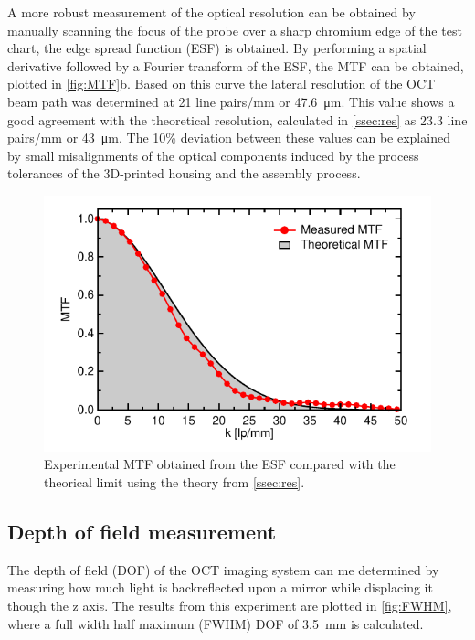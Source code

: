 \documentclass[10pt]{iopart}
\begin{document}
A more robust measurement of the optical resolution can be obtained by manually scanning the focus of the probe over a sharp chromium edge of the test chart, the edge spread function (ESF) is obtained. By performing a spatial derivative followed by a Fourier transform of the ESF, the MTF can be obtained, plotted in \autoref{fig:MTF}b. Based on this curve the lateral resolution of the OCT beam path was determined at 21 line pairs/mm or \SI{47.6}{\micro\meter}. This value shows a good agreement with the theoretical resolution, calculated in \autoref{ssec:res} as 23.3 line pairs/mm or \SI{43}{\micro\meter}. The 10\% deviation between these values can be explained by small misalignments of the optical components induced by the process tolerances of the 3D-printed housing and the assembly process.
\begin{figure}[h!]\centering \includegraphics[width=\columnwidth]{figures/confRes.pdf}
      \caption{Experimental MTF obtained from the ESF compared with the theorical limit using the theory from \autoref{ssec:res}.}
      \label{fig:MTF}
\end{figure}


\subsection{Depth of field measurement}
The depth of field (DOF) of the OCT imaging system can me determined by measuring how much light is backreflected upon a mirror while displacing it though the z axis. The results from this experiment are plotted in \autoref{fig:FWHM}, where a full width half maximum (FWHM) DOF of \SI{3.5}{\milli\meter} is calculated. 
\end{document}
